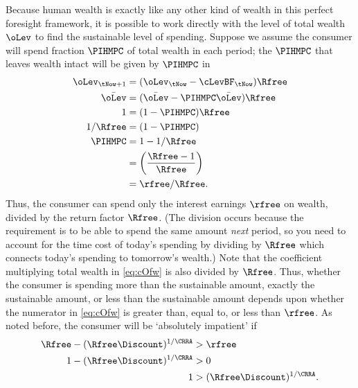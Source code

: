 Because human wealth is exactly like any other kind of wealth in this
perfect foresight framework, it is possible to work directly with the level of total
wealth $\oLev$ to find the sustainable level of spending.  Suppose we assume the consumer will spend fraction
$\PIHMPC$ of total wealth in each period; the
$\PIHMPC$ that leaves wealth intact will be given by $\PIHMPC$ in
\begin{equation*}\begin{gathered}\begin{aligned}
        \oLev_{\tNow+1} & =  (\oLev_{\tNow}-\cLevBF_{\tNow})\Rfree
\\  \bar\oLev & =  (\bar\oLev-\PIHMPC \bar\oLev)\Rfree
\\      1 & =  (1-\PIHMPC)  \Rfree
\\      1/\Rfree & =  (1-\PIHMPC)
\\  \PIHMPC & =  1-1/\Rfree
\\  & =  \left(\frac{\Rfree -1}{\Rfree}\right)
\\  & =  \rfree/\Rfree \label{eq:PIHMPC}
.
\end{aligned}\end{gathered}\end{equation*}
Thus, the consumer can spend only the interest earnings $\rfree$ on
wealth, divided by the return factor $\Rfree$.  (The division occurs because
the requirement is to be able to spend the same amount {\it next} period,
so you need to account for the time cost of today's spending by dividing by $\Rfree$ which
connects today's spending to tomorrow's wealth.)
Note that the coefficient multiplying total wealth in \eqref{eq:cOfw}
is also divided by $\Rfree$.  Thus, whether the consumer is spending
more than the sustainable amount, exactly the sustainable amount, or
less than the sustainable amount depends upon whether the numerator in
\eqref{eq:cOfw} is greater than, equal to, or less than $\rfree$.  As noted before,
the consumer will be `absolutely impatient' if
\begin{equation}\begin{gathered}\begin{aligned}
        \Rfree-(\Rfree\Discount)^{1/\CRRA} & >  \rfree  \\
        1-(\Rfree\Discount)^{1/\CRRA} & >  0  \notag \\
        1 & >  (\Rfree\Discount)^{1/\CRRA}. \notag
\end{aligned}\end{gathered}\end{equation}

